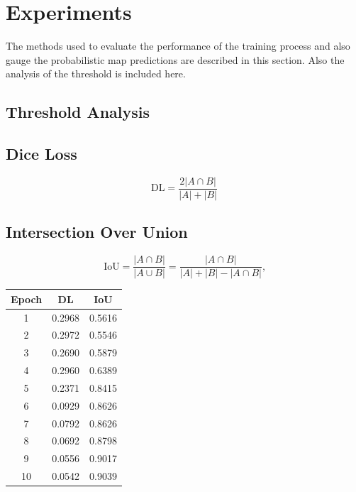 \section{Experiments}
The methods used to evaluate the performance of the training process and also gauge the probabilistic map predictions are described in this section. Also the analysis of the threshold is included here.

\subsection{Threshold Analysis}

\subsection{Dice Loss}
\begin{center}
  \begin{equation}\label{eq:dice_loss}
      \text{DL} = \frac{2|A \cap B |}{|A| + |B|}
  \end{equation}        
\end{center}

\subsection{Intersection Over Union}
\begin{equation}\label{eq:jacc}
  \text{IoU} = \frac{|A \cap B|}{| A \cup B |} = \frac{|A \cap B|}{|A| + |B| - |A \cap B|} \text{,}
\end{equation}

\begin{table}[ht]
  \centering
  \begin{tabular}{c c c}
    \toprule
    \textbf{Epoch} & \textbf{DL} & \textbf{IoU} \\
    \midrule
    1 & 0.2968 & 0.5616 \\
    2 & 0.2972 & 0.5546 \\
    3 & 0.2690 & 0.5879 \\
    4 & 0.2960 & 0.6389 \\
    5 & 0.2371 & 0.8415 \\
    6 & 0.0929 & 0.8626 \\
    7 & 0.0792 & 0.8626 \\
    8 & 0.0692 & 0.8798 \\
    9 & 0.0556 & 0.9017 \\
    10 & 0.0542 & 0.9039 \\
    \bottomrule
    
  \end{tabular}
\end{table}

